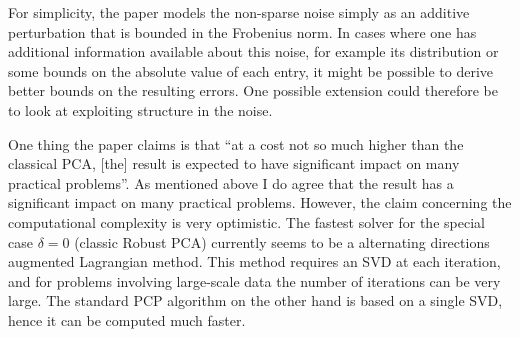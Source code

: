 \documentclass{article}
\begin{document}
For simplicity, the paper models the non-sparse noise simply as an additive perturbation that is bounded in the Frobenius norm. In cases where one has additional information available about this noise, for example its distribution or some bounds on the absolute value of each entry, it might be possible to derive better bounds on the resulting errors. One possible extension could therefore be to look at exploiting structure in the noise. 

One thing the paper claims is that ``at a cost not so much higher than the classical PCA, [the] result is expected to have significant impact on many practical problems''. As mentioned above I do agree that the result has a significant impact on many practical problems. However, the claim concerning the computational complexity is very optimistic. The fastest solver for the special case $\delta =0$ (classic Robust PCA) currently seems to be a alternating directions augmented Lagrangian method. This method requires an SVD at each iteration, and for problems involving large-scale data the number of iterations can be very large. The standard PCP algorithm on the other hand is based on a single SVD, hence it can be computed much faster. 






\end{document}
